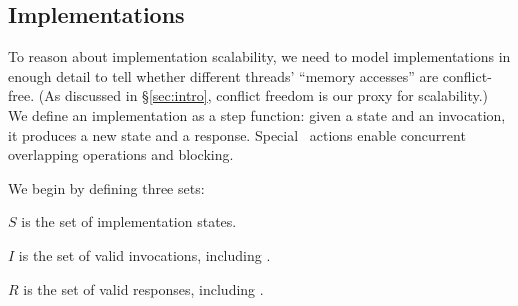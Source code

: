 %

\begin{comment}
  Finally, \SIM\ commutativity is region-oriented. In contrast with
  typical definitions of commutativity, which consider pairs of
  operations, \SIM\ commutativity applies to any number of threads with
  arbitrary sequences of potentially concurrent operations. This is not
  strictly required by the commutativity rule, but it is a natural
  generalization and it is often convenient to consider likely sequences
  of concurrent operations.
\end{comment}



\subsection{Implementations}

To reason about implementation scalability, we need to model
implementations in enough detail to tell
whether different threads' ``memory accesses'' are conflict-free. (As 
discussed in \S\ref{sec:intro}, conflict freedom is our proxy for
scalability.) We define an implementation as a step
function: given a state and an invocation, it produces a new state and a
response. Special \CONTINUE\ actions enable
concurrent overlapping operations and blocking.

We begin by defining three sets:

\begin{CompactItemize}
\item $S$ is the set of implementation states.
\item $I$ is the set of valid invocations, including \CONTINUE.
\item $R$ is the set of valid responses, including \CONTINUE.
\end{CompactItemize}

